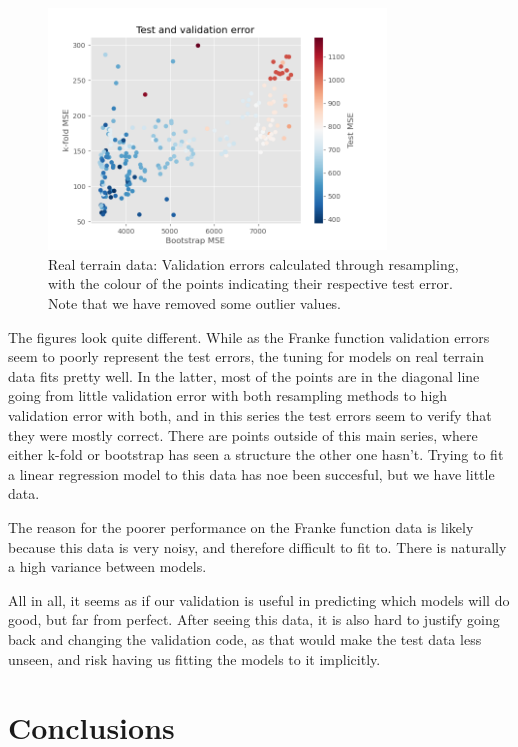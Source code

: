 \documentclass[11pt, a4paper]{report}
\begin{document}
\begin{figure}
\begin{center}
\includegraphics[width=0.8\textwidth]{../plots/test_validation_error_real.png}
\end{center}
\caption{Real terrain data: Validation errors calculated through resampling, with the colour of the points indicating their respective test error. Note that we have removed some outlier values.}
\label{fig:test_validation_error_real}
\end{figure}

The figures look quite different. While as the Franke function validation errors seem to poorly represent the test errors, the tuning for models on real terrain data fits pretty well. In the latter, most of the points are in the diagonal line going from little validation error with both resampling methods to high validation error with both, and in this series the test errors seem  to verify that they were mostly correct. There are points outside of this main series, where either k-fold or bootstrap has seen a structure the other one hasn't. Trying to fit a linear regression model to this data has noe been succesful, but we have little data.

The reason for the poorer performance on the Franke function data is likely because this data is very noisy, and therefore difficult to fit to. There is naturally a high variance between models.

All in all, it seems as if our validation is useful in predicting which models will do good, but far from perfect. After seeing this data, it is also hard to justify going back and changing the validation code, as that would make the test data less unseen, and risk having us fitting the models to it implicitly.

\chapter{Conclusions}
\end{document}
